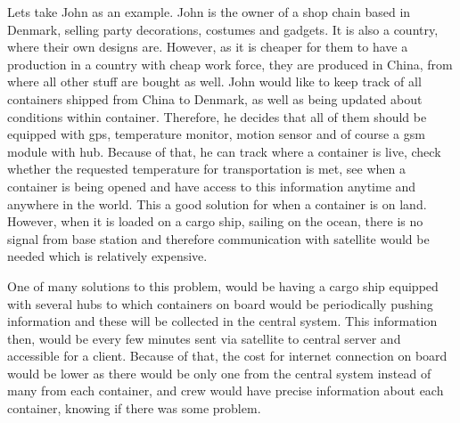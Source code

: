 Lets take John as an example. John is the owner of a shop chain based in Denmark, selling party decorations, costumes and gadgets. It is also a country, where their own designs are. However, as it is cheaper for them to have a production in a country with cheap work force, they are produced in China, from where all other stuff are bought as well. John would like to keep track of all containers shipped from China to Denmark, as well as being updated about conditions within container. Therefore, he decides that all of them should be equipped with \acrshort{gps}, temperature monitor, motion sensor and of course a \acrshort{gsm} module with hub. Because of that, he can track where a container is live, check whether the requested temperature for transportation is met, see when a container is being opened and have access to this information anytime and anywhere in the world. This a good solution for when a container is on land. However, when it is loaded on a cargo ship, sailing on the ocean, there is no signal from base station and therefore communication with satellite would be needed which is relatively expensive\footnotemark.
% 


One of many solutions to this problem, would be having a cargo ship equipped with several hubs to which containers on board would be periodically pushing information and these will be collected in the central system. This information then, would be every few minutes sent via satellite to central server and accessible for a client. Because of that, the cost for internet connection on board would be lower as there would be only one from the central system instead of many from each container, and crew would have precise information about each container, knowing if there was some problem.